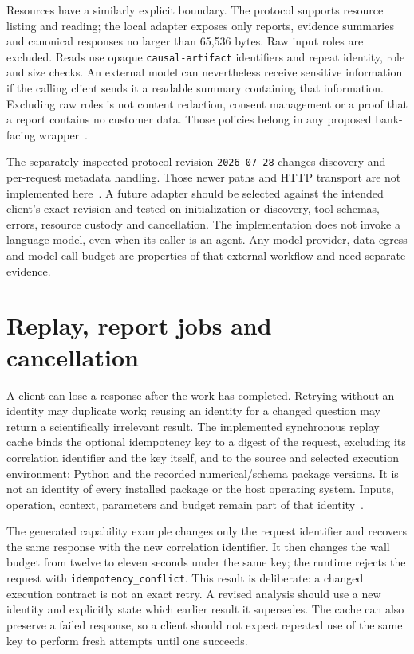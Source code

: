Resources have a similarly explicit boundary. The protocol supports resource
listing and reading; the local adapter exposes only reports, evidence
summaries and canonical responses no larger than 65,536 bytes. Raw input
roles are excluded. Reads use opaque \texttt{causal-artifact} identifiers
and repeat identity, role and size checks. An external model can nevertheless
receive sensitive information if the calling client sends it a readable
summary containing that information. Excluding raw roles is not content
redaction, consent management or a proof that a report contains no customer
data. Those policies belong in any proposed bank-facing wrapper~\citep{v12_mcp_legacy_resources,v12_in_runtime}.

The separately inspected protocol revision \texttt{2026-07-28} changes
discovery and per-request metadata handling. Those newer paths and HTTP
transport are not implemented here~\citep{v12_mcp_versioning,v12_mcp_basic}.
A future adapter should be selected against the intended client's exact
revision and tested on initialization or discovery, tool schemas, errors,
resource custody and cancellation. The implementation does not invoke a
language model, even when its caller is an agent. Any model provider, data
egress and model-call budget are properties of that external workflow and
need separate evidence.

\section{Replay, report jobs and cancellation}

A client can lose a response after the work has completed. Retrying without
an identity may duplicate work; reusing an identity for a changed question
may return a scientifically irrelevant result. The implemented synchronous
replay cache binds the optional idempotency key to a digest of the request,
excluding its correlation identifier and the key itself, and to the source
and selected execution environment: Python and the recorded numerical/schema
package versions. It is not an identity of every installed package or the
host operating system. Inputs, operation, context, parameters and budget
remain part of that identity~\citep{exec13_i2_examples}.

The generated capability example changes only the request identifier and
recovers the same response with the new correlation identifier. It then
changes the wall budget from twelve to eleven seconds under the same key;
the runtime rejects the request with \texttt{idempotency\_conflict}.
This result is deliberate: a changed execution contract is not an exact
retry. A revised analysis should use a new identity and explicitly state
which earlier result it supersedes. The cache can also preserve a failed
response, so a client should not expect repeated use of the same key to
perform fresh attempts until one succeeds.

